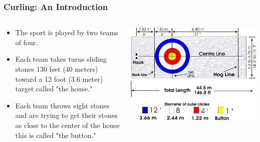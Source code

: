 \documentclass{beamer}
\begin{document}
\begin{frame}\frametitle{Curling: An Introduction}
    \begin{columns}    
        \begin{column}{0.35\textwidth}    
            \begin{itemize}
                \item The sport is played by two teams of four. 
                \item Each team takes turns sliding stones 130 feet (40 meters) toward a 12 foot (3.6 meter) target called "the house."
                \item Each team throws eight stones and are trying to get their stones as close to the center of the house this is called "the button."
            \end{itemize}
        \end{column}
        \begin{column}{0.6\textwidth}    
            \centering
            \includegraphics[width=1.0\textwidth]{Images/icesheet.jpg}
        \end{column}
    \end{columns}    
\end{frame}
\end{document}
